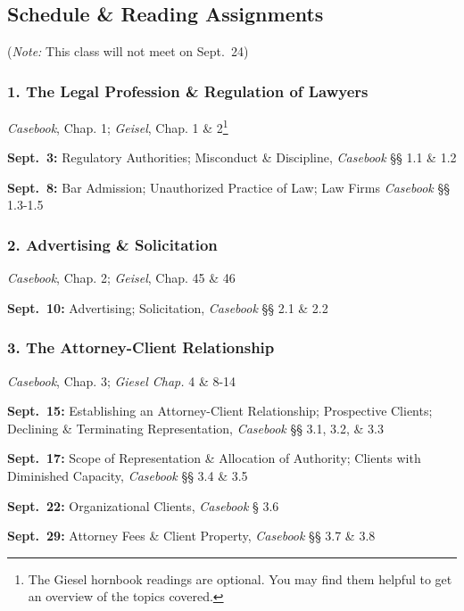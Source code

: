 \documentclass[11pt,letterpaper,twoside]{article}
\begin{document}
\subsection{Schedule \& Reading
Assignments}\label{schedule-reading-assignments}

(\emph{Note:} This class will not meet on Sept.~24)

\subsubsection{1. The Legal Profession \& Regulation of
Lawyers}\label{the-legal-profession-regulation-of-lawyers}

\emph{Casebook}, Chap. 1; \emph{Geisel}, Chap. 1 \& 2\footnote{The
  Giesel hornbook readings are optional. You may find them helpful to
  get an overview of the topics covered.}

\textbf{Sept.~3:} Regulatory Authorities; Misconduct \& Discipline,
\emph{Casebook} §§ 1.1 \& 1.2

\textbf{Sept.~8:} Bar Admission; Unauthorized Practice of Law; Law Firms
\emph{Casebook} §§ 1.3-1.5

\subsubsection{2. Advertising \&
Solicitation}\label{advertising-solicitation}

\emph{Casebook}, Chap. 2; \emph{Geisel}, Chap. 45 \& 46

\textbf{Sept.~10:} Advertising; Solicitation, \emph{Casebook} §§ 2.1 \&
2.2

\subsubsection{3. The Attorney-Client
Relationship}\label{the-attorney-client-relationship}

\emph{Casebook}, Chap. 3; \emph{Giesel Chap.} 4 \& 8-14

\textbf{Sept.~15:} Establishing an Attorney-Client Relationship;
Prospective Clients; Declining \& Terminating Representation,
\emph{Casebook} §§ 3.1, 3.2, \& 3.3

\textbf{Sept.~17:} Scope of Representation \& Allocation of Authority;
Clients with Diminished Capacity, \emph{Casebook} §§ 3.4 \& 3.5

\textbf{Sept.~22:} Organizational Clients, \emph{Casebook} § 3.6

\textbf{Sept.~29:} Attorney Fees \& Client Property, \emph{Casebook} §§
3.7 \& 3.8
\end{document}

